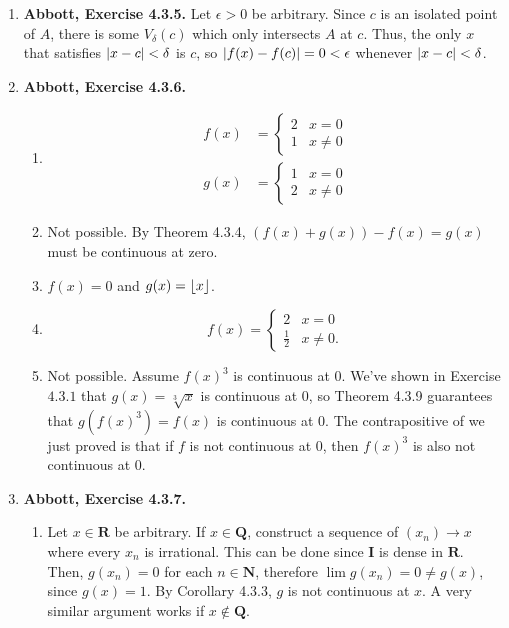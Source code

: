 \documentclass{article}
\DeclarePairedDelimiter\abs{\lvert}{\rvert}
\DeclarePairedDelimiter\floor{\lfloor}{\rfloor}
\newcommand{\N}{\mathbf{N}}
\newcommand{\Q}{\mathbf{Q}}
\newcommand{\I}{\mathbf{I}}
\newcommand{\R}{\mathbf{R}}
\newcommand{\exc}[2][Abbott]{\item \textbf{#1, Exercise #2.}}
\newcommand{\lep}[1][L]{#1et $\epsilon > 0$ be arbitrary}
\begin{document}
\begin{enumerate}
    \exc{4.3.5}
    \lep. Since $c$ is an isolated point of $A$, there is some $V_\delta (c)$ which only intersects $A$ at $c$. Thus, the only $x$ that satisfies $\abs{x-c} < \delta$ is $c$, so $\abs{f(x)-f(c)} = 0 < \epsilon$ whenever $\abs{x-c} < \delta$.
    
    \exc{4.3.6}
    \begin{enumerate}
        \item 
        \begin{align*}
            f(x) &= \begin{cases}
            2 & x = 0 \\ 
            1 & x \neq 0
            \end{cases} \\
            g(x) &= \begin{cases}
            1 & x = 0 \\ 
            2 & x \neq 0
            \end{cases}
        \end{align*}
        
        \item Not possible. By Theorem 4.3.4, $(f(x)+g(x))-f(x) = g(x)$ must be continuous at zero.
        
        \item $f(x) = 0$ and $g(x)= \floor{x}$.
        
        \item \begin{equation*}
            f(x) = \begin{cases}
            2 & x = 0 \\ 
            \frac{1}{2} & x \neq 0.
            \end{cases}
        \end{equation*}
        
        \item Not possible. Assume $f(x)^3$ is continuous at $0$. We've shown in Exercise $4.3.1$ that $g(x)=\sqrt[3]{x}$ is continuous at $0$, so Theorem 4.3.9 guarantees that $g(f(x)^3) = f(x)$ is continuous at $0$. The contrapositive of we just proved is that if $f$ is not continuous at $0$, then $f(x)^3$ is also not continuous at $0$.
    \end{enumerate}
    
    \exc{4.3.7}
    \begin{enumerate}
        \item Let $x \in \R$ be arbitrary. If $x \in \Q$, construct a sequence of $(x_n) \to x$ where every $x_n$ is irrational. This can be done since $\I$ is dense in $\R$. Then, $g(x_n) = 0$ for each $n \in \N$, therefore $\lim g(x_n) = 0 \neq g(x)$, since $g(x) = 1$. By Corollary 4.3.3, $g$ is not continuous at $x$. A very similar argument works if $x \notin \Q$.
        

\end{enumerate}
\end{enumerate}
\end{document}
